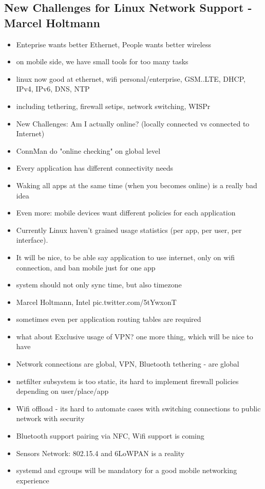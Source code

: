 \documentclass[10pt]{article}
\begin{document}
{\subsection{New Challenges for Linux Network Support - Marcel Holtmann}
\begin{itemize}
\item Enteprise wants better Ethernet, People wants better wireless
\item on mobile side, we have small tools for too many tasks
\item linux now good at ethernet, wifi personal/enterprise, GSM..LTE, DHCP, IPv4, IPv6, DNS, NTP
\item including tethering, firewall setips, network switching, WISPr
\item New Challenges: Am I actually online? (locally connected vs connected to Internet)
\item ConnMan do "online checking" on global level
\item Every application has different connectivity needs
\item Waking all apps at the same time (when you becomes online) is a really bad idea
\item Even more: mobile devices want different policies for each application
\item Currently Linux haven't grained usage statistics (per app, per user, per interface).
\item It will be nice, to be able say application to use internet, only on wifi connection, and ban mobile just for one app
\item system should not only sync time, but also timezone
\item Marcel Holtmann, Intel pic.twitter.com/5tYwxonT
\item sometimes even per application routing tables are required
\item what about Exclusive usage of VPN? one more thing, which will be nice to have
\item Network connections are global, VPN, Bluetooth tethering - are global
\item netfilter subsystem is too static, its hard to implement firewall policies depending on user/place/app
\item Wifi offload - its hard to automate cases with switching connections to public network with security
\item Bluetooth support pairing via NFC, Wifi support is coming
\item Sensors Network: 802.15.4 and 6LoWPAN is a reality
\item systemd and cgroups will be mandatory for a good mobile networking experience
\end{itemize}

}
\end{document}

